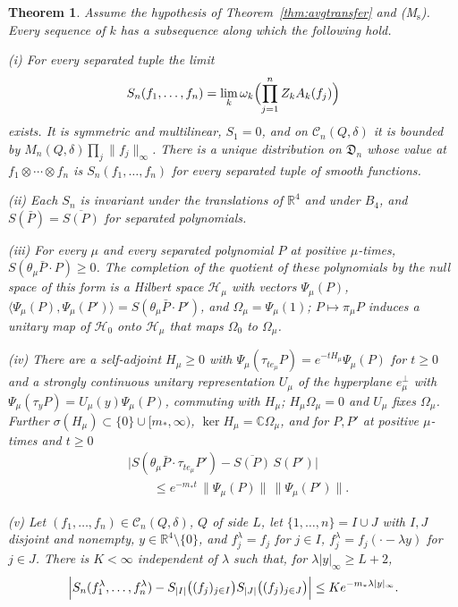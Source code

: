 \documentclass[aps,prd,twocolumn,superscriptaddress,nofootinbib,longbibliography,floatfix,amsmath,amssymb,10pt]{revtex4-2}
\newtheorem{theorem}{Theorem}
\theoremstyle{definition}
\theoremstyle{remark}
\newcommand{\R}{\mathbb{R}}
\newcommand{\C}{\mathbb{C}}
\newcommand{\ip}[2]{\langle #1,#2\rangle}
\begin{document}
\begin{theorem}\label{thm:limitEsep}
Assume the hypothesis of Theorem~\textup{\ref{thm:avgtransfer}} and
\textup{(M$_{\mathrm s}$)}. Every sequence of $k$ has a subsequence along
which the following hold.

\textup{(i)} For every separated tuple the limit
\[
S_n(f_1,\dots,f_n)=\lim_k\omega_k\Bigl(\prod_{j=1}^nZ_kA_k(f_j)\Bigr)
\]
exists. It is symmetric and multilinear, $S_1=0$, and on $\mathcal
C_n(Q,\delta)$ it is bounded by $M_n(Q,\delta)\prod_j\|f_j\|_\infty$. There is a unique
distribution on $\mathfrak D_n$ whose value at $f_1\otimes\cdots\otimes f_n$
is $S_n(f_1,\dots,f_n)$ for every separated tuple of smooth functions.

\textup{(ii)} Each $S_n$ is invariant under the translations of $\R^4$ and
under $B_4$, and $S(\bar P)=\overline{S(P)}$ for separated polynomials.

\textup{(iii)} For every $\mu$ and every separated polynomial $P$ at
positive $\mu$-times, $S(\theta_\mu\bar P\cdot P)\ge0$. The completion of
the quotient of these polynomials by the null space of this form is a
Hilbert space $\mathcal H_\mu$ with vectors $\Psi_\mu(P)$,
$\ip{\Psi_\mu(P)}{\Psi_\mu(P')}=S(\theta_\mu\bar P\cdot P')$, and
$\Omega_\mu=\Psi_\mu(1)$; $P\mapsto\pi_\mu P$ induces a unitary map of
$\mathcal H_0$ onto $\mathcal H_\mu$ that maps $\Omega_0$ to $\Omega_\mu$.

\textup{(iv)} There are a self-adjoint $H_\mu\ge0$ with
$\Psi_\mu(\tau_{te_\mu}P)=e^{-tH_\mu}\Psi_\mu(P)$ for $t\ge0$ and a strongly
continuous unitary representation $U_\mu$ of the hyperplane
$e_\mu^\perp$ with $\Psi_\mu(\tau_yP)=U_\mu(y)\Psi_\mu(P)$, commuting with
$H_\mu$; $H_\mu\Omega_\mu=0$ and $U_\mu$ fixes $\Omega_\mu$. Further
$\sigma(H_\mu)\subset\{0\}\cup[m_*,\infty)$, $\ker H_\mu=\C\Omega_\mu$, and
for $P,P'$ at positive $\mu$-times and $t\ge0$
\[
\begin{split}
&\bigl|S(\theta_\mu\bar P\cdot\tau_{te_\mu}P')-\overline{S(P)}\,S(P')\bigr|\\
&\qquad\le e^{-m_*t}\,\|\Psi_\mu(P)\|\,\|\Psi_\mu(P')\| .
\end{split}
\]

\textup{(v)} Let $(f_1,\dots,f_n)\in\mathcal C_n(Q,\delta)$, $Q$ of side
$L$, let $\{1,\dots,n\}=I\cup J$ with $I,J$ disjoint and nonempty, $y\in
\R^4\setminus\{0\}$, and $f^\lambda_j=f_j$ for $j\in I$, $f^\lambda_j=f_j(
\cdot-\lambda y)$ for $j\in J$. There is $K<\infty$ independent of $\lambda$
such that, for $\lambda|y|_\infty\ge L+2$,
\[
\Bigl|S_n(f^\lambda_1,\dots,f^\lambda_n)-S_{|I|}\bigl((f_j)_{j\in I}\bigr)
S_{|J|}\bigl((f_j)_{j\in J}\bigr)\Bigr|\le Ke^{-m_*\lambda|y|_\infty} .
\]


\end{theorem}
\end{document}
